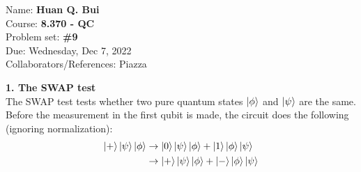 \documentclass{article}
\theoremstyle{definition}
\begin{document}
\begin{framed}
\noindent Name: \textbf{Huan Q. Bui}\\
Course: \textbf{8.370 - QC}\\
Problem set: \textbf{\#9}\\
Due: Wednesday, Dec 7, 2022\\
Collaborators/References: Piazza
\end{framed}



\noindent \textbf{1. The SWAP test} \\


\noindent The SWAP test tests whether two pure quantum states $\ket{\phi}$ and $\ket{\psi}$ are the same. Before the measurement in the first qubit is made, the circuit does the following (ignoring normalization):
\begin{align*}
	\ket{+} \ket{\psi} \ket{\phi}  &\to \ket{0}\ket{\psi}\ket{\phi} + \ket{1}\ket{\phi}\ket{\psi}\\
	&\to  \ket{+}\ket{\psi}\ket{\phi}+ \ket{-}\ket{\phi}\ket{\psi}
\end{align*}
\end{document}

